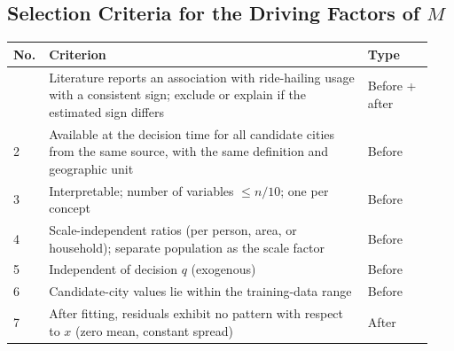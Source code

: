 \documentclass[10pt,a4paper]{article}
\begin{document}
\begin{mdframed}[linecolor=red,linewidth=0.6pt,innerleftmargin=8pt,innerrightmargin=8pt]
\subsection{Selection Criteria for the Driving Factors of $M$}
{\footnotesize
\begin{longtable}{@{}L{0.06\linewidth}L{0.73\linewidth}L{0.15\linewidth}@{}}
\toprule No. & Criterion & Type\\\midrule\endhead\bottomrule{} & Literature reports an association with ride-hailing usage with a consistent sign; exclude or explain if the estimated sign differs & Before + after\\
2 & Available at the decision time for all candidate cities from the same source, with the same definition and geographic unit & Before\\
3 & Interpretable; number of variables $\le n/10$; one per concept & Before\\
4 & Scale-independent ratios (per person, area, or household); separate population as the scale factor & Before\\
5 & Independent of decision $q$ (exogenous) & Before\\
6 & Candidate-city values lie within the training-data range & Before\\
7 & After fitting, residuals exhibit no pattern with respect to $x$ (zero mean, constant spread) & After\\
\end{longtable}}

\end{mdframed}
\end{document}
